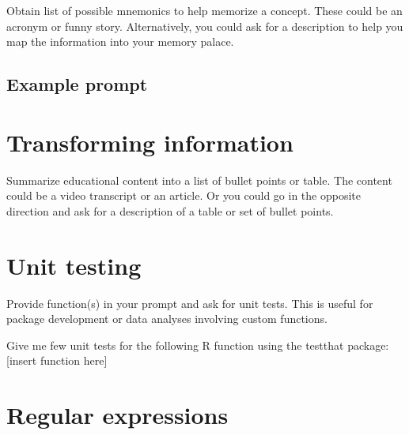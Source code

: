 \documentclass[
  letterpaper,
  DIV=11,
  numbers=noendperiod]{scrreprt}
\newenvironment{Shaded}{\begin{snugshade}}{\end{snugshade}}
\newcommand{\InformationTok}[1]{\textcolor[rgb]{0.37,0.37,0.37}{#1}}
\newcommand{\NormalTok}[1]{\textcolor[rgb]{0.00,0.23,0.31}{#1}}
\begin{document}
Obtain list of possible mnemonics to help memorize a concept. These
could be an acronym or funny story. Alternatively, you could ask for a
description to help you map the information into your memory palace.

\hypertarget{example-prompt}{%
\subsection{Example prompt}\label{example-prompt}}

\begin{Shaded}
\end{Shaded}

\hypertarget{transforming-information}{%
\section{Transforming information}\label{transforming-information}}

Summarize educational content into a list of bullet points or table. The content could be a video transcript or an article. Or you could go in the
opposite direction and ask for a description of a table or set of bullet points.

\hypertarget{unit-testing}{%
\section{Unit testing}\label{unit-testing}}

Provide function(s) in your prompt and ask for unit tests. This is
useful for package development or data analyses involving custom
functions.

\begin{Shaded}
\begin{Highlighting}[]
\NormalTok{Give me few unit tests for the following R function using }
\NormalTok{the testthat package: }\InformationTok{\textasciigrave{}[insert function here]\textasciigrave{}}
\end{Highlighting}
\end{Shaded}

\hypertarget{regular-expressions}{%
\section{Regular expressions}\label{regular-expressions}}
\end{document}
